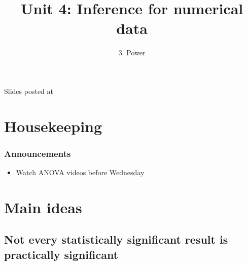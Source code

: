 \documentclass[11pt,containsverbatim,handout,xcolor=xelatex,dvipsnames,table]{beamer}
\title{Unit 4: Inference for numerical data}
\subtitle{3. Power}
\author{\CourseName}
\date{}
\institute{\InstituteName}
\begin{document}



\begin{frame}[plain]

\titlepage

\vfill

{\scriptsize {} \hfill Slides posted at  \webURL{\CourseSite}}

\addtocounter{framenumber}{-1} 

\end{frame}


\section{Housekeeping}


\begin{frame}
\frametitle{Announcements}

\begin{itemize}

\item Watch ANOVA videos before Wednesday

\end{itemize}

\end{frame}


\section{Main ideas}

%


\subsection{Not every statistically significant result is practically significant}
\label{mi1}
\end{document}
